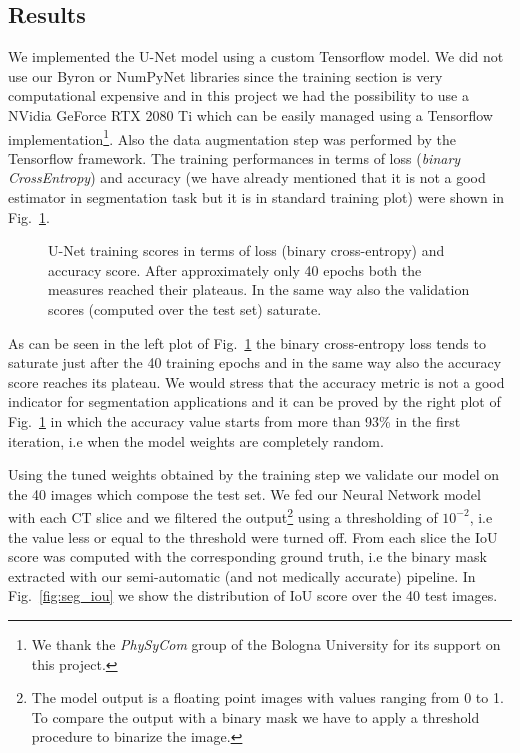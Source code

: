 \documentclass{standalone}
\begin{document}
\subsection[Results]{Results}\label{segmentation:results}

We implemented the U-Net model using a custom \textsf{Tensorflow} model.
We did not use our \textsf{Byron} or \textsf{NumPyNet} libraries since the training section is very computational expensive and in this project we had the possibility to use a NVidia GeForce RTX 2080 Ti which can be easily managed using a \textsf{Tensorflow} implementation\footnote{
  We thank the \emph{PhySyCom} group of the Bologna University for its support on this project.
}.
Also the data augmentation step was performed by the \textsf{Tensorflow} framework.
The training performances in terms of loss (\emph{binary CrossEntropy}) and accuracy (we have already mentioned that it is not a good estimator in segmentation task but it is  in standard training plot) were shown in Fig.~\ref{fig:seg_train}.

\begin{figure}[htbp]
\centering
\def\svgwidth{0.85\textwidth}

\caption{U-Net training scores in terms of loss (binary cross-entropy) and accuracy score.
After approximately only 40 epochs both the measures reached their plateaus.
In the same way also the validation scores (computed over the test set) saturate.
}
\label{fig:seg_train}
\end{figure}

As can be seen in the left plot of Fig.~\ref{fig:seg_train} the binary cross-entropy loss tends to saturate just after the 40 training epochs and in the same way also the accuracy score reaches its plateau.
We would stress that the accuracy metric is not a good indicator for segmentation applications and it can be proved by the right plot of Fig.~\ref{fig:seg_train} in which the accuracy value starts from more than 93\% in the first iteration, i.e when the model weights are completely random.

Using the tuned weights obtained by the training step we validate our model on the 40 images which compose the test set.
We fed our Neural Network model with each CT slice and we filtered the output\footnote{
  The model output is a floating point images with values ranging from 0 to 1.
  To compare the output with a binary mask we have to apply a threshold procedure to binarize the image.
} using a thresholding of $10^{-2}$, i.e the value less or equal to the threshold were turned off.
From each slice the IoU score was computed with the corresponding ground truth, i.e the binary mask extracted with our semi-automatic (and not medically accurate) pipeline.
In Fig.~\ref{fig:seg_iou} we show the distribution of IoU score over the 40 test images.
\end{document}
